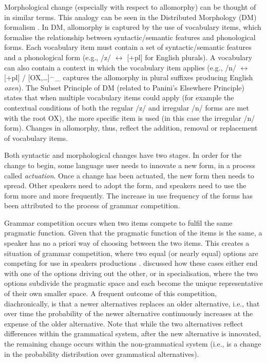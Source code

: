 	Morphological change (especially with respect to allomorphy) can be thought of in similar terms. This analogy can be seen in the Distributed Morphology (DM) formalism \citep{Halle.1993}. In DM, allomorphy is captured by the use of vocabulary items, which formalise the relationship between syntactic/semantic features and phonological forms. Each vocabulary item must contain a set of syntactic/semantic features and a phonological form (e.g., /z/ $\leftrightarrow$ [+pl] for English plurals). A vocabulary can also contain a context in which the vocabulary item applies (e.g., /n/ $\leftrightarrow$ [+pl] / [OX,\dots]$^{\smallfrown}$\_ captures the allomorphy in plural suffixes producing English \textit{oxen}). The Subset Principle of DM (related to Panini's Elsewhere Principle) states that when multiple vocabulary items could apply (for example the contextual conditions of both the regular /z/ and irregular /n/ forms are met with the root OX), the more specific item is used (in this case the irregular /n/ form). Changes in allomorphy, thus, reflect the addition, removal or replacement of vocabulary items.

	Both syntactic and morphological changes have two stages. In order for the change to begin, some language user needs to innovate a new form, in a process called \textit{actuation}. Once a change has been actuated, the new form then needs to spread. Other speakers need to adopt the form, and speakers need to use the form more and more frequently. The increase in use frequency of the forms has been attributed to the process of grammar competition.
	
	Grammar competition occurs when two items compete to fulfil the same pragmatic function. Given that the pragmatic function of the items is the same, a speaker has no a priori way of choosing between the two items. This creates a situation of grammar competition, where two equal (or nearly equal) options are competing for use in speakers productions \citep{Kroch.1989}. \cite{Wallenberg.2013} discussed how these cases either end with one of the options driving out the other, or in specialisation, where the two options subdivide the pragmatic space and each become the unique representative of their own smaller space. A frequent outcome of this competition, diachronically, is that a newer alternatives replaces an older alternative, i.e., that over time the probability of the newer alternative continuously increases at the expense of the older alternative. Note that while the two alternatives reflect differences within the grammatical system, after the new alternative is innovated, the remaining change occurs within the non-grammatical system (i.e., is a change in the probability distribution over grammatical alternatives).

